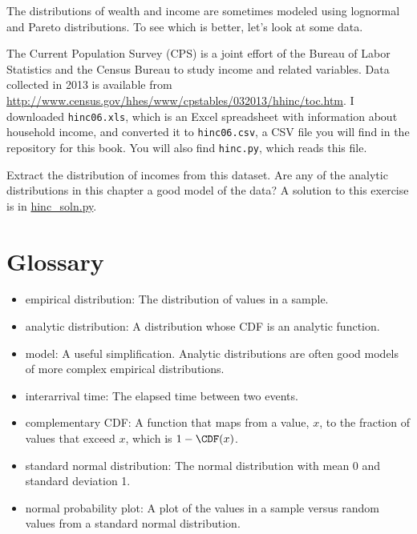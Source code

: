 \begin{exercise}
\label{income}

The distributions of wealth and income are sometimes modeled using
lognormal and Pareto distributions.  To see which is better, let's
look at some data.

The Current Population Survey (CPS) is a joint effort of the Bureau
of Labor Statistics and the Census Bureau to study income and related
variables.  Data collected in 2013 is available from
\url{http://www.census.gov/hhes/www/cpstables/032013/hhinc/toc.htm}.
I downloaded {\tt hinc06.xls}, which is an Excel spreadsheet with
information about household income, and converted it to {\tt hinc06.csv},
a CSV file you will find in the repository for this book.  You
will also find {\tt hinc.py}, which reads this file.

Extract the distribution of incomes from this dataset.  Are any of the
analytic distributions in this chapter a good model of the data?  A
solution to this exercise is in \url{hinc_soln.py}.

\end{exercise}




\section{Glossary}

\begin{itemize}

\item empirical distribution: The distribution of values in a sample.
   

\item analytic distribution: A distribution whose CDF is an analytic
function.

\item model: A useful simplification.  Analytic distributions are
often good models of more complex empirical distributions.

\item interarrival time: The elapsed time between two events.

\item complementary CDF: A function that maps from a value, $x$,
to the fraction of values that exceed $x$, which is $1 - \CDF(x)$.
  

\item standard normal distribution: The normal distribution with
mean 0 and standard deviation 1.

\item normal probability plot: A plot of the values in a sample versus
random values from a standard normal distribution.

\end{itemize}

